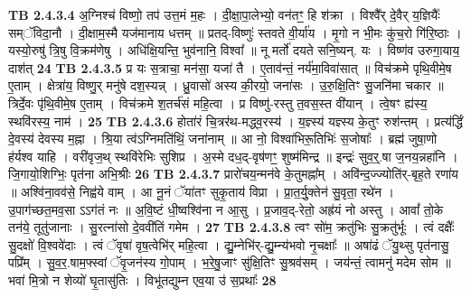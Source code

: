 \documentclass[17pt]{extarticle}
\begin{document}
                  \newline
                                \textbf{ TB 2.4.3.4} \newline
                  अ॒ग्निश्च॑ विष्णो॒ तप॑ उत्त॒मं म॒हः । दी॒क्षा॒पा॒लेभ्यो॒ वन॑तꣳ॒॒ हि श॑क्रा । विश्वै᳚र् दे॒वैर् य॒ज्ञियैः᳚ सम्ॅविदा॒नौ । दी॒क्षाम॒स्मै यज॑मानाय धत्तम् ॥ प्रतद्-विष्णुः॑ स्तवते वी॒र्या॑य । मृ॒गो न भी॒मः कु॑च॒रो गि॑रि॒ष्ठाः । यस्यो॒रुषु॑ त्रि॒षु वि॒क्रम॑णेषु । अधि॑क्षि॒यन्ति॒ भुव॑नानि॒ विश्वा᳚ ॥ नू मर्तो॑ दयते सनि॒ष्यन्. यः । विष्ण॑व उरुगा॒याय॒ दाश॑त् \textbf{ 24} \newline
                  \newline
                                \textbf{ TB 2.4.3.5} \newline
                  प्र यः स॒त्राचा॒ मन॑सा॒ यजा॑ तै । ए॒ताव॑न्तं॒ नर्य॑मा॒विवा॑सात् ॥ विच॑क्रमे पृथि॒वीमे॒ष ए॒ताम् । क्षेत्रा॑य॒ विष्णु॒र् मनु॑षे दश॒स्यन्न् । ध्रु॒वासो॑ अस्य की॒रयो॒ जना॑सः । उ॒रु॒क्षि॒तिꣳ सु॒जनि॑मा चकार ॥ त्रिर्दे॒वः पृ॑थि॒वीमे॒ष ए॒ताम् । विच॑क्रमे श॒तर्च॑सं महि॒त्वा । प्र विष्णु॑-रस्तु त॒वस॒स्त वी॑यान् । त्वे॒षꣳ ह्य॑स्य॒ स्थवि॑रस्य॒ नाम॑ । \textbf{ 25} \newline
                  \newline
                                \textbf{ TB 2.4.3.6} \newline
                  होता॑रं चि॒त्रर॑थ-मद्ध्व॒रस्य॑ । य॒ज्ञ्स्य॑ यज्ञ्स्य के॒तुꣳ रुश॑न्तम् । प्रत्य॑र्द्धिं दे॒वस्य॑ देवस्य म॒ह्ना । श्रि॒या त्व॑ऽग्निमति॑थिं॒ जना॑नाम् ॥ आ नो॒ विश्वा॑भिरू॒तिभिः॑ स॒जोषाः᳚ । ब्रह्म॑ जुषा॒णो ह॑र्यश्व याहि । वरी॑वृज॒थ् स्थवि॑रेभिः सुशिप्र । अ॒स्मे दध॒द्-वृष॑णꣳ॒॒ शुष्म॑मिन्द्र ॥ इन्द्रः॑ सुव॒र्॒.षा ज॒नय॒न्नहा॑नि । जि॒गायो॒शिग्भिः॒ पृत॑ना अभि॒श्रीः \textbf{ 26} \newline
                  \newline
                                \textbf{ TB 2.4.3.7} \newline
                  प्रारो॑चय॒न्मन॑वे के॒तुमह्ना᳚म् । अवि॑न्द॒ज्ज्योति॑र्-बृह॒ते रणा॑य ॥ अश्वि॑ना॒वव॑से॒ निह्व॑ये वाम् । आ नू॒नं ॅया॑तꣳ सुकृ॒ताय॑ विप्रा । प्रा॒त॒र्यु॒क्तेन॑ सु॒वृता॒ रथे॑न । उ॒पाग॑च्छत॒मव॒सा ऽऽग॑तं नः ॥ अ॒वि॒ष्टं धी॒ष्वश्वि॑ना न आ॒सु । प्र॒जाव॒द्-रेतो॒ अह्र॑यं नो अस्तु । आवां᳚ तो॒के तन॑ये॒ तूतु॑जानाः । सु॒रत्ना॑सो दे॒ववी॑तिं गमेम । \textbf{ 27} \newline
                  \newline
                                \textbf{ TB 2.4.3.8} \newline
                  त्वꣳ सो॑म॒ क्रतु॑भिः सु॒क्रतु॑र्भूः । त्वं दक्षैः᳚ सु॒दक्षो॑ वि॒श्ववे॑दाः । त्वं ॅवृषा॑ वृष॒त्वेभि॑र् महि॒त्वा । द्यु॒म्नेभि॑र्-द्यु॒म्न्य॑भवो नृ॒चक्षाः᳚ ॥ अषा॑ढं ॅयु॒थ्सु पृत॑नासु॒ पप्रि᳚म् । सु॒व॒र॒.षाम॒फ्स्वां ॅवृ॒जन॑स्य गो॒पाम् । भ॒रे॒षु॒जाꣳ सु॑क्षि॒तिꣳ सु॒श्रव॑सम् । जय॑न्तं॒ त्वामनु॑ मदेम सोम ॥ भवा॑ मि॒त्रो न शेव्यो॑ घृ॒तासु॑तिः । विभू॑तद्युम्न एव॒या उ॑ स॒प्रथाः᳚ \textbf{ 28} \newline
\end{document}
